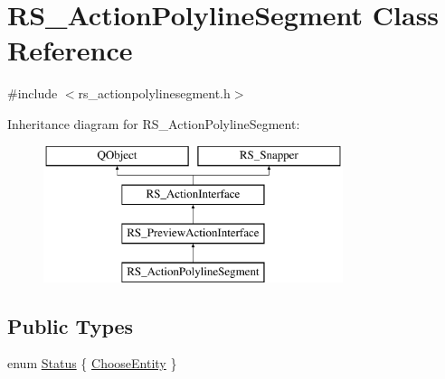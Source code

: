 \hypertarget{classRS__ActionPolylineSegment}{\section{R\-S\-\_\-\-Action\-Polyline\-Segment Class Reference}
\label{classRS__ActionPolylineSegment}
}


{\ttfamily \#include $<$rs\-\_\-actionpolylinesegment.\-h$>$}

Inheritance diagram for R\-S\-\_\-\-Action\-Polyline\-Segment\-:\begin{figure}[H]
\begin{center}
\leavevmode
\includegraphics[height=4.000000cm]{classRS__ActionPolylineSegment}
\end{center}
\end{figure}
\subsection*{Public Types}
\begin{DoxyCompactItemize}
\item 
enum \hyperlink{classRS__ActionPolylineSegment_ad062c8f4755909fb12148923b853aba3}{Status} \{ \hyperlink{classRS__ActionPolylineSegment_ad062c8f4755909fb12148923b853aba3a302aed8269f18ad65325528cfed0437c}{Choose\-Entity}
 \}
\end{DoxyCompactItemize}
